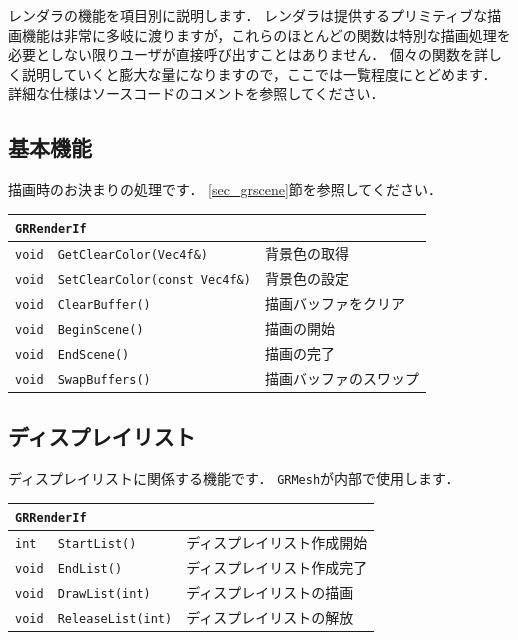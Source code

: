 \KLUDGE レンダラの機能を項目別に説明します．
\KLUDGE レンダラは提供するプリミティブな描画機能は非常に多岐に渡りますが，これらのほとんどの関数は特別な描画処理を必要としない限りユーザが直接呼び出すことはありません．
\KLUDGE 個々の関数を詳しく説明していくと膨大な量になりますので，ここでは一覧程度にとどめます．
\KLUDGE 詳細な仕様はソースコードのコメントを参照してください．

\subsection*{基本機能}

\KLUDGE 描画時のお決まりの処理です．
\ref{sec_grscene}節を参照してください．

\begin{center}
\begin{tabular}{p{.1\hsize}p{.45\hsize}p{.35\hsize}}
\multicolumn{2}{l}{\texttt{GRRenderIf}}									\\ \midrule
\texttt{void} & \texttt{GetClearColor(Vec4f\&)}			& 背景色の取得				\\
\texttt{void} & \texttt{SetClearColor(const Vec4f\&)}	& 背景色の設定				\\
\texttt{void} & \texttt{ClearBuffer()}					& 描画バッファをクリア		\\
\texttt{void} & \texttt{BeginScene()}					& 描画の開始				\\
\texttt{void} & \texttt{EndScene()}						& 描画の完了				\\
\texttt{void} & \texttt{SwapBuffers()}					& 描画バッファのスワップ	\\
\end{tabular}
\end{center}

\subsection*{ディスプレイリスト}

\KLUDGE ディスプレイリストに関係する機能です．
\texttt{GRMesh}が内部で使用します．

\begin{center}
\begin{tabular}{p{.1\hsize}p{.45\hsize}p{.35\hsize}}
\multicolumn{2}{l}{\texttt{GRRenderIf}}					\\ \midrule
\texttt{int}  & \texttt{StartList()}			& ディスプレイリスト作成開始	\\
\texttt{void} & \texttt{EndList()}				& ディスプレイリスト作成完了	\\
\texttt{void} & \texttt{DrawList(int)}			& ディスプレイリストの描画		\\
\texttt{void} & \texttt{ReleaseList(int)}		& ディスプレイリストの解放		\\
\end{tabular}
\end{center}

